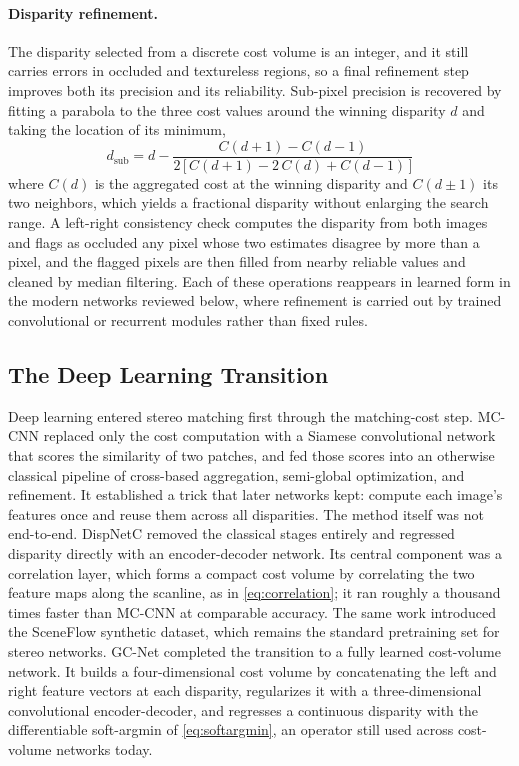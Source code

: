 \paragraph{Disparity refinement.}
The disparity selected from a discrete cost volume is an integer, and it
still carries errors in occluded and textureless regions, so a final
refinement step improves both its precision and its reliability. Sub-pixel
precision is recovered by fitting a parabola \cite{scharstein2002taxonomy}
to the three cost values around the winning disparity $d$ and taking the
location of its minimum,
\begin{equation}
d_{\text{sub}} = d - \frac{C(d + 1) - C(d - 1)}{2\,\big[\,C(d + 1) - 2\,C(d) + C(d - 1)\,\big]}
\label{eq:subpixel}
\end{equation}
where $C(d)$ is the aggregated cost at the winning disparity and
$C(d \pm 1)$ its two neighbors, which yields a fractional disparity without
enlarging the search range. A left-right consistency check computes the
disparity from both images and flags as occluded any pixel whose two
estimates disagree by more than a pixel, and the flagged pixels are then
filled from nearby reliable values and cleaned by median filtering. Each of
these operations reappears in learned form in the modern networks reviewed
below, where refinement is carried out by trained convolutional or
recurrent modules rather than fixed rules.

\FloatBarrier
\subsection{The Deep Learning Transition}
Deep learning entered stereo matching first through the matching-cost
step. MC-CNN \cite{zbontar2016mccnn} replaced only the cost computation
with a Siamese convolutional network that scores the similarity of two
patches, and fed those scores into an otherwise classical pipeline of
cross-based aggregation, semi-global optimization, and refinement. It
established a trick that later networks kept: compute each image's
features once and reuse them across all disparities. The method itself
was not end-to-end. DispNetC \cite{mayer2016sceneflow} removed the
classical stages entirely and regressed disparity directly with an
encoder-decoder network. Its central component was a correlation layer,
which forms a compact cost volume by correlating the two feature maps
along the scanline, as in \eqref{eq:correlation}; it ran roughly a
thousand times faster than MC-CNN at comparable accuracy. The same work
introduced the SceneFlow synthetic dataset, which remains the standard
pretraining set for stereo networks. GC-Net \cite{kendall2017gcnet}
completed the transition to a fully learned cost-volume network. It
builds a four-dimensional cost volume by concatenating the left and right
feature vectors at each disparity, regularizes it with a
three-dimensional convolutional encoder-decoder, and regresses a
continuous disparity with the differentiable soft-argmin of
\eqref{eq:softargmin}, an operator still used across cost-volume networks
today.


